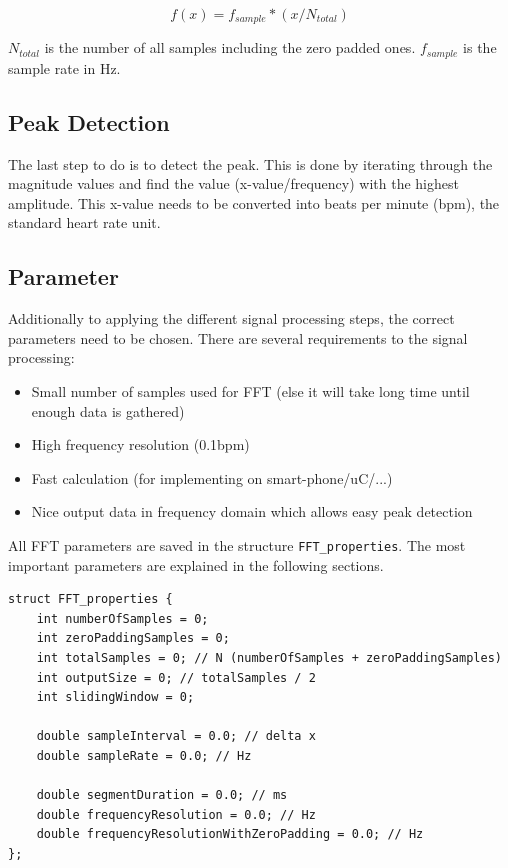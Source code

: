 \documentclass[notitlepage]{scrreprt}
\begin{document}
\begin{equation}
f(x) = f_{sample} * (x / N_{total})
\end{equation}

$N_{total}$ is the number of all samples including the zero padded ones. $f_{sample}$ is the sample rate in Hz.

\subsection{Peak Detection}
The last step to do is to detect the peak. This is done by iterating through the magnitude values and find the value (x-value/frequency) with the highest amplitude. This x-value needs to be converted into beats per minute (bpm), the standard heart rate unit.

\subsection{Parameter}
Additionally to applying the different signal processing steps, the correct parameters need to be chosen. There are several requirements to the signal processing:

\begin{itemize}
	\item{Small number of samples used for FFT (else it will take long time until enough data is gathered)}
	\item{High frequency resolution (0.1bpm)}
	\item{Fast calculation (for implementing on smart-phone/uC/...)}
	\item{Nice output data in frequency domain which allows easy peak detection}\\
\end{itemize}

All FFT parameters are saved in the structure \lstinline$FFT_properties$. The most important parameters are explained in the following sections.

\begin{lstlisting}
struct FFT_properties {
    int numberOfSamples = 0;
    int zeroPaddingSamples = 0;
    int totalSamples = 0; // N (numberOfSamples + zeroPaddingSamples)
    int outputSize = 0; // totalSamples / 2
    int slidingWindow = 0;

    double sampleInterval = 0.0; // delta x
    double sampleRate = 0.0; // Hz

    double segmentDuration = 0.0; // ms
    double frequencyResolution = 0.0; // Hz
    double frequencyResolutionWithZeroPadding = 0.0; // Hz
};
\end{lstlisting}
\end{document}
